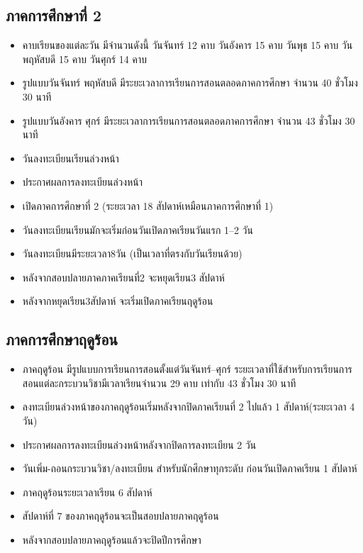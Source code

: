 \subsection{ภาคการศึกษาที่ 2}
\begin{itemize}
  \item คาบเรียนของแต่ละวัน มีจำนวนดังนี้ วันจันทร์ 12 คาบ วันอังคาร 15 คาบ วันพุธ 15 คาบ วันพฤหัสบดี 15 คาบ วันศุกร์ 14 คาบ
  \item รูปแบบวันจันทร์ พฤหัสบดี มีระยะเวลาการเรียนการสอนตลอดภาคการศึกษา จำนวน 40 ชั่วโมง 30 นาที
  \item รูปแบบวันอังคาร ศุกร์ มีระยะเวลาการเรียนการสอนตลอดภาคการศึกษา จำนวน 43 ชั่วโมง 30 นาที
  \item วันลงทะเบียนเรียนล่วงหน้า 
  \item ประกาศผลการลงทะเบียนล่วงหน้า 
  \item เปิดภาคการศึกษาที่ 2 (ระยะเวลา 18 สัปดาห์เหมือนภาคการศึกษาที่ 1)
  \item วันลงทะเบียนเรียนมักจะเริ่มก่อนวันเปิดภาคเรียนวันแรก 1--2 วัน
  \item วันลงทะเบียนมีระยะเวลา8วัน (เป็นเวลาที่ตรงกับวันเรียนด้วย)
  \item หลังจากสอบปลายภาคภาคเรียนที่2 จะหยุดเรียน3 สัปดาห์
  \item หลังจากหยุดเรียน3สัปดาห์ จะเริ่มเปิดภาคเรียนฤดูร้อน
\end{itemize}

\subsection{ภาคการศึกษาฤดูร้อน}
\begin{itemize}
  \item ภาคฤดูร้อน มีรูปแบบการเรียนการสอนตั้งแต่วันจันทร์--ศุกร์ ระยะเวลาที่ใช้สำหรับการเรียนการสอนแต่ละกระบวนวิชามีเวลาเรียนจำนวน 29 คาบ เท่ากับ 43 ชั่วโมง 30 นาที
  \item ลงทะเบียนล่วงหน้าของภาคฤดูร้อนเริ่มหลังจากปิดภาคเรียนที่ 2 ไปแล้ว 1 สัปดาห์(ระยะเวลา 4 วัน)
  \item ประกาศผลการลงทะเบียนล่วงหน้าหลังจากปิดการลงทะเบียน 2 วัน
  \item วันเพิ่ม-ถอนกระบวนวิชา/ลงทะเบียน สำหรับนักศึกษาทุกระดับ ก่อนวันเปิดภาคเรียน 1 สัปดาห์
  \item ภาคฤดูร้อนระยะเวลาเรียน 6 สัปดาห์
  \item สัปดาห์ที่ 7 ของภาคฤดูร้อนจะเป็นสอบปลายภาคฤดูร้อน
  \item หลังจากสอบปลายภาคฤดูร้อนแล้วจะปิดปีการศึกษา
\end{itemize}

